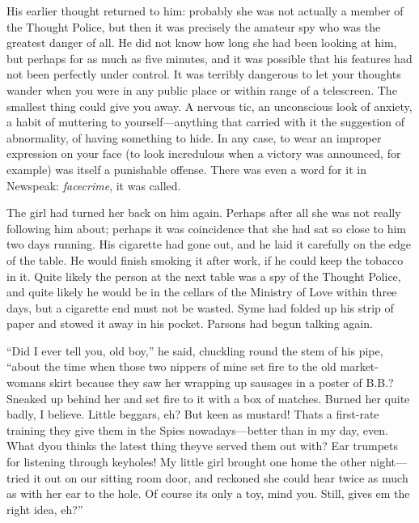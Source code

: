 His earlier thought returned to him: probably she was not actually a
member of the Thought Police, but then it was precisely the amateur spy
who was the greatest danger of all. He did not know how long she had
been looking at him, but perhaps for as much as five minutes, and it was
possible that his features had not been perfectly under control. It was
terribly dangerous to let your thoughts wander when you were in any
public place or within range of a telescreen. The smallest thing could
give you away. A nervous tic, an unconscious look of anxiety, a habit of
muttering to yourself---anything that carried with it the suggestion of
abnormality, of having something to hide. In any case, to wear an
improper expression on your face (to look incredulous when a victory was
announced, for example) was itself a punishable offense. There was even
a word for it in Newspeak: \emph{facecrime}, it was called.

The girl had turned her back on him again. Perhaps after all she was not
really following him about; perhaps it was coincidence that she had sat
so close to him two days running. His cigarette had gone out, and he
laid it carefully on the edge of the table. He would finish smoking it
after work, if he could keep the tobacco in it. Quite likely the person
at the next table was a spy of the Thought Police, and quite likely he
would be in the cellars of the Ministry of Love within three days, but a
cigarette end must not be wasted. Syme had folded up his strip of paper
and stowed it away in his pocket. Parsons had begun talking again.

``Did I ever tell you, old boy,'' he said, chuckling round the stem of his
pipe, ``about the time when those two nippers of mine set fire to the old
market-woman\textquotesingle s skirt because they saw her wrapping up
sausages in a poster of B.B.? Sneaked up behind her and set fire to it
with a box of matches. Burned her quite badly, I believe. Little
beggars, eh? But keen as mustard! That\textquotesingle s a first-rate
training they give them in the Spies nowadays---better than in my day,
even. What d\textquotesingle you think\textquotesingle s the latest
thing they\textquotesingle ve served them out with? Ear trumpets for
listening through keyholes! My little girl brought one home the other
night---tried it out on our sitting room door, and reckoned she could
hear twice as much as with her ear to the hole. Of course
it\textquotesingle s only a toy, mind you. Still, gives
\textquotesingle em the right idea, eh?''

